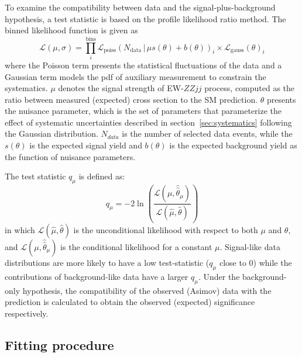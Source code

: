 To examine the compatibility between data and the signal-plus-background hypothesis, 
a test statistic is based on the profile likelihood ratio method.
The binned likelihood function is given as
\begin{equation}
	\mathcal{L}(\mu,\sigma) = \prod_{i}^\mathrm{bins} \mathcal{L}_{\mathrm{poiss}}(N_{\mathrm{data}}\,|\,\mu s(\theta)+b(\theta))_{i} \times \mathcal{L}_{\text{gauss}}(\theta)_{i}
\end{equation}
where the Poisson term presents the statistical fluctuations of the data 
and a Gaussian term models the pdf of auxiliary measurement to constrain the systematics.
$\mu$ denotes the signal strength of EW-$ZZjj$ process, computed as the ratio between measured (expected) cross section to the SM prediction.
$\theta$ presents the nuisance parameter, which is the set of parameters that parameterize the effect of systematic uncertainties described in section~\ref{sec:systematics} following the Gaussian distribution.
$N_{data}$ is the number of selected data events, while the $s(\theta)$ is the expected signal yield and $b(\theta)$ is the expected background yield as the function of nuisance parameters.

The test statistic $q_{\mu}$ is defined as:
\begin{equation}
	q_\mu = -2 \ln \left( \dfrac{\mathcal{L}(\mu,\hat{\hat{\theta}}_{\mu})}{\mathcal{L}(\hat{\mu},\hat{\theta})} \right)
\end{equation}
in which $\mathcal{L}(\hat{\mu},\hat{\theta})$ is the unconditional likelihood with respect to both $\mu$ and $\theta$,
and $\mathcal{L}(\mu,\hat{\hat{\theta}}_{\mu})$ is the conditional likelihood for a constant $\mu$.
Signal-like data distributions are more likely to have a low test-statistic ($q_\mu$ close to 0) 
while the contributions of background-like data have a larger $q_\mu$.
Under the background-only hypothesis, the compatibility of the observed (Asimov) data with the prediction 
is calculated to obtain the observed (expected) significance respectively.
\fi

\subsection{Fitting procedure}


